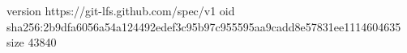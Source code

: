 version https://git-lfs.github.com/spec/v1
oid sha256:2b9dfa6056a54a124492edef3c95b97c955595aa9cadd8e57831ee1114604635
size 43840
